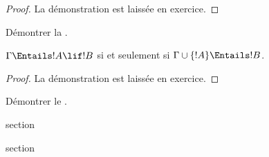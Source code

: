 \documentclass[11pt,a4paper,openany]{memoir}
\begin{document}
\begin{proof}
La démonstration est laissée en exercice.
\end{proof}

\begin{prob}
Démontrer la .
\end{prob}

\begin{thm}
  $\Gamma \Entails !A \lif !B$ si et seulement si
  $\Gamma \cup \{!A\} \Entails !B$.
\end{thm}

\begin{proof}
La démonstration est laissée en exercice.
\end{proof}

\begin{prob}
Démontrer le .
\end{prob}


\endgroup


\OLEndChapterHook


\endgroup


\begingroup
\expandafter\def\csname ol@sectioncs\endcsname{section}
\def\olfilename{introduction}




\begingroup
\expandafter\def\csname ol@sectioncs\endcsname{section}
\def\olfilename{first-order-logic}



\end{document}
